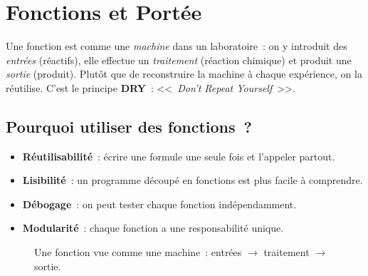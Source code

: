 \chapter{Fonctions et Port\'ee}
\label{ch:fonctions}

\begin{intuition}
Une fonction est comme une \emph{machine} dans un laboratoire~: on y introduit des
\emph{entr\'ees} (r\'eactifs), elle effectue un \emph{traitement} (r\'eaction chimique) et
produit une \emph{sortie} (produit). Plut\^ot que de reconstruire la machine \`a chaque
exp\'erience, on la r\'eutilise. C'est le principe \textbf{DRY}~:
<<~\emph{Don't Repeat Yourself}~>>.
\end{intuition}

\section{Pourquoi utiliser des fonctions~?}

\begin{itemize}
    \item \textbf{R\'eutilisabilit\'e}~: \'ecrire une formule une seule fois et l'appeler partout.
    \item \textbf{Lisibilit\'e}~: un programme d\'ecoup\'e en fonctions est plus facile \`a comprendre.
    \item \textbf{D\'ebogage}~: on peut tester chaque fonction ind\'ependamment.
    \item \textbf{Modularit\'e}~: chaque fonction a une responsabilit\'e unique.
\end{itemize}

\begin{figure}[ht]
\centering
{}
\caption{Une fonction vue comme une machine~: entr\'ees $\to$ traitement $\to$ sortie.}
\label{fig:fonction-machine}
\end{figure}

